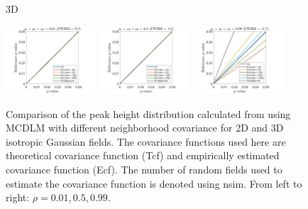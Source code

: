\documentclass{article}
\newcommand{\sdcom}[1]{\textit{\color{red} [SD: #1]}}
\begin{document}
\begin{figure}[!htp]
\begin{sideways}
\phantom{------------------}3D
\end{sideways}
\includegraphics[trim=80 5 80 5, clip,width=0.3\textwidth]{figure/3D_rho1_0.01_rho2_0.01_rho3_0.01.jpg}
\includegraphics[trim=80 5 80 5, clip,width=0.3\textwidth]{figure/3D_rho1_0.5_rho2_0.5_rho3_0.5.jpg}
\includegraphics[trim=80 5 80 5, clip,width=0.3\textwidth]{figure/3D_rho1_0.99_rho2_0.99_rho3_0.99.jpg}
\caption{Comparison of the peak height distribution calculated from using MCDLM with different neighborhood covariance for 2D and 3D isotropic Gaussian fields. The covariance functions used here are theoretical covariance function (Tcf) and empirically estimated covariance function (Ecf). The number of random fields used to estimate the covariance function is denoted using nsim. From left to right: $\rho = 0.01, 0.5, 0.99$. \label{fig13}}
\end{figure}
\end{document}
